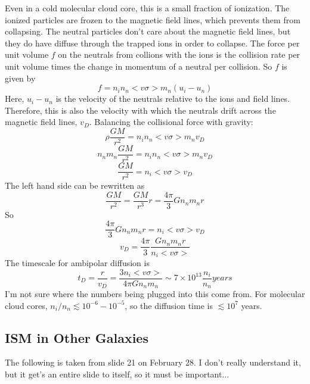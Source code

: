 Even in a cold molecular cloud core, this is a small fraction of ionization.  
The ionized particles are frozen to the magnetic field lines, which prevents 
them from collapsing.  The neutral particles don't care about the magnetic 
field lines, but they do have diffuse through the trapped ions in order to 
collapse.  The force per unit volume $f$ on the neutrals from collions with the 
ions is the collision rate per unit volume times the change in momentum 
of a neutral per collision.  So $f$ is given by
\begin{equation}
f=n_in_n<v\sigma>m_n(u_i-u_n)
\end{equation}
Here, $u_i-u_n$ is the velocity of the neutrals relative to the ions and field 
lines.  Therefore, this is also the velocity with which the neutrals drift 
across the magnetic field lines, $v_D$.  Balancing the collisional force with 
gravity:
\begin{equation}
\rho\frac{GM}{r^2}=n_in_n<v\sigma>m_nv_D
\end{equation}
\begin{equation}
n_nm_n\frac{GM}{r^2}=n_in_n<v\sigma>m_nv_D
\end{equation}
\begin{equation}
\frac{GM}{r^2}=n_i<v\sigma>v_D
\end{equation}
The left hand side can be rewritten as
\begin{equation}
\frac{GM}{r^2}=\frac{GM}{r^3}r=\frac{4\pi}{3}Gn_nm_nr
\end{equation}
So
\begin{equation}
\frac{4\pi}{3}Gn_nm_nr=n_i<v\sigma>v_D
\end{equation}
\begin{equation}
v_D=\frac{4\pi}{3}\frac{Gn_nm_nr}{n_i<v\sigma>}
\end{equation}
The timescale for ambipolar diffusion is 
\begin{equation}
t_D=\frac{r}{v_D}=\frac{3n_i<v\sigma>}{4\pi Gn_nm_n}\sim7\times10^{13}\frac{n_i}{n_n} years
\end{equation}
I'm not sure where the numbers being plugged into this come from.  For 
molecular cloud cores, $n_i/n_n\lesssim10^{-6}-10^{-5}$, so the diffusion time 
is $\lesssim10^7$ years.

\subsection{ISM in Other Galaxies}
The following is taken from slide 21 on February 28.  I don't really understand 
it, but it get's an entire slide to itself, so it must be important...

